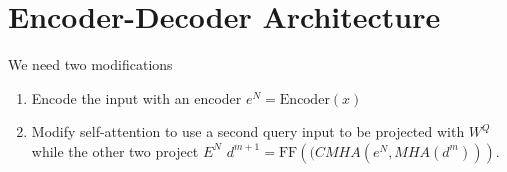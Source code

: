 \section{Encoder-Decoder Architecture}

We need two modifications

\begin{enumerate}
\item Encode the input with an encoder $e^N = \mathrm{Encoder}(x)$
\item Modify self-attention to use a second query input to be projected with $W^Q$ while the other two project $E^N$ $d^{m+1} = \mathrm{FF}(\mathrm(CMHA(e^N, MHA(d^m))).$
\end{enumerate}

